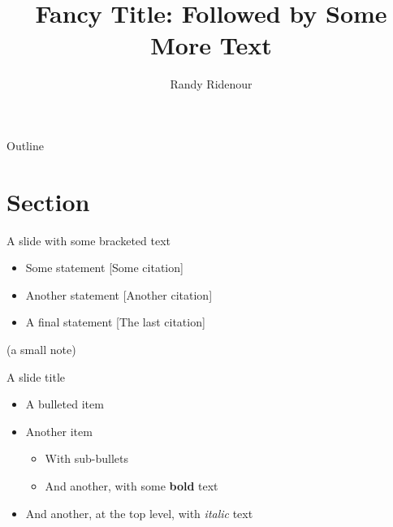 \documentclass[14pt,aspectratio=169]{beamer}
\title{Fancy Title: Followed by Some More Text}
\author{Randy Ridenour}
\institute[shortinst]{Oklahoma Baptist University}
\begin{document}

\frame[plain]{\titlepage}

\begin{frame}[plain]{Outline}
  \tableofcontents
\end{frame}


\section{Section}




\begin{frame}{A slide with some bracketed text}

	\begin{itemize}
		\item Some statement {\color{gray} [Some citation]}
		\item Another statement {\color{gray} [Another citation]}
		\item A final statement {\color{gray} [The last citation]}
	\end{itemize}

	\vspace{3ex}
	\begin{center}
		\scriptsize (a small note)
	\end{center}

\end{frame}


\begin{frame}{A slide title}

  \begin{itemize}
    \item A bulleted item
    \item Another item
      \begin{itemize}
        \item With sub-bullets
        \item And another, with some \textbf{bold} text
      \end{itemize}
    \item And another, at the top level, with \textit{italic} text
  \end{itemize}


\end{frame}
\end{document}
